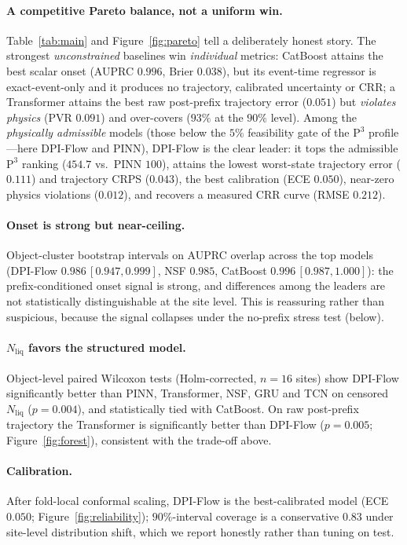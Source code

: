 \documentclass[letterpaper]{article} %
\begin{document}
\paragraph{A competitive Pareto balance, not a uniform win.} Table~\ref{tab:main} and
Figure~\ref{fig:pareto} tell a deliberately honest story. The strongest \emph{unconstrained} baselines win
\emph{individual} metrics: CatBoost attains the best scalar onset (AUPRC $0.996$, Brier $0.038$), but its
event-time regressor is exact-event-only and it produces no trajectory, calibrated uncertainty or
CRR; a Transformer attains the best raw post-prefix trajectory error ($0.051$) but \emph{violates physics}
(PVR $0.091$) and over-covers ($93\%$ at the $90\%$ level). Among the \emph{physically admissible} models
(those below the $5\%$ feasibility gate of the $\mathrm{P}^3$ profile---here DPI-Flow and PINN), DPI-Flow
is the clear leader: it tops the admissible $\mathrm{P}^3$ ranking ($454.7$ vs.\ PINN $100$), attains the
lowest worst-state trajectory error ($0.111$) and trajectory CRPS ($0.043$), the best calibration
(ECE $0.050$), near-zero physics violations ($0.012$), and recovers a measured CRR curve (RMSE $0.212$).

\paragraph{Onset is strong but near-ceiling.} Object-cluster bootstrap intervals on AUPRC overlap across
the top models (DPI-Flow $0.986\,[0.947,0.999]$, NSF $0.985$, CatBoost $0.996\,[0.987,1.000]$): the
prefix-conditioned onset signal is strong, and differences among the leaders are not statistically
distinguishable at the site level. This is reassuring rather than suspicious, because the signal collapses
under the no-prefix stress test (below).

\paragraph{$N_{\mathrm{liq}}$ favors the structured model.} Object-level paired Wilcoxon tests
(Holm-corrected, $n{=}16$ sites) show DPI-Flow significantly better than PINN, Transformer, NSF, GRU and
TCN on censored $N_{\mathrm{liq}}$ ($p{=}0.004$), and statistically tied with CatBoost. On raw post-prefix
trajectory the Transformer is significantly better than DPI-Flow ($p{=}0.005$; Figure~\ref{fig:forest}),
consistent with the trade-off above.

\paragraph{Calibration.} After fold-local conformal scaling, DPI-Flow is the best-calibrated model
(ECE $0.050$; Figure~\ref{fig:reliability}); $90\%$-interval coverage is a conservative $0.83$ under
site-level distribution shift, which we report honestly rather than tuning on test.
\end{document}
